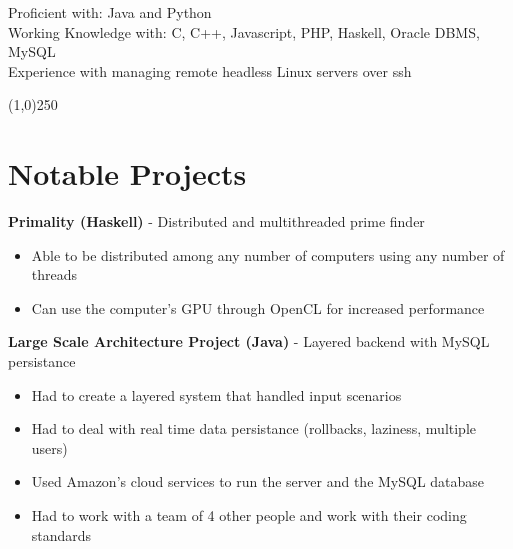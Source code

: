 \documentclass[margin,line, 11pt]{resume}
\begin{document}
\begin{resume}
    Proficient with: Java and Python							\vspace{2mm}\\						
    Working Knowledge with: C, C++, Javascript, PHP, Haskell, Oracle DBMS, MySQL					\vspace{2mm}\\
    Experience with managing remote headless Linux servers over ssh
    
    \vspace{-5mm}
    \line(1,0){250}
    
    
    \section{\mysidestyle \textbf {Notable Projects}}
    
    \vspace{0mm}

     \textbf{Primality (Haskell)} - Distributed and multithreaded prime finder
     \begin{itemize}
      \item Able to be distributed among any number of computers using any number of threads
      \item Can use the computer's GPU through OpenCL for increased performance
     \end{itemize}

     \textbf{Large Scale Architecture Project (Java)} - Layered backend with MySQL persistance
     \begin{itemize}
      \item Had to create a layered system that handled input scenarios
      \item Had to deal with real time data persistance (rollbacks, laziness, multiple users)
      \item Used Amazon's cloud services to run the server and the MySQL database
      \item Had to work with a team of 4 other people and work with their coding standards
     \end{itemize}
% 


\end{resume}
\end{document}
